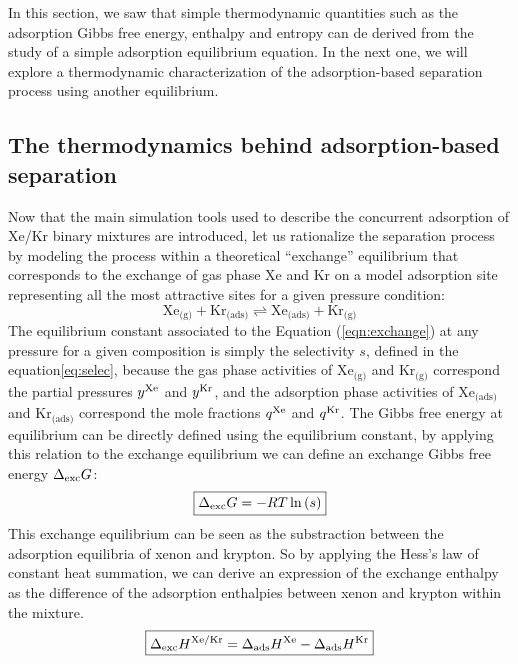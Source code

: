 \documentclass[main.tex]{subfiles}
\begin{document}
In this section, we saw that simple thermodynamic quantities such as the adsorption Gibbs free energy, enthalpy and entropy can de derived from the study of a simple adsorption equilibrium equation. In the next one, we will explore a thermodynamic characterization of the adsorption-based separation process using another equilibrium. 

\subsection{The thermodynamics behind adsorption-based separation}

Now that the main simulation tools used to describe the concurrent adsorption of Xe/Kr binary mixtures are introduced, let us rationalize the separation process by modeling the process within a theoretical ``exchange'' equilibrium that corresponds to the exchange of gas phase Xe and Kr on a model adsorption site representing all the most attractive sites for a given pressure condition:
\begin{equation} \label{eqn:exchange}
    \text{Xe}_{\text{(g)}} + \text{Kr}_{\text{(ads)}}
    \rightleftharpoons \text{Xe}_{\text{(ads)}} + \text{Kr}_{\text{(g)}}
\end{equation}
The equilibrium constant associated to the Equation (\ref{eqn:exchange}) at any pressure for a given composition is simply the selectivity $s$, defined in the equation\ref{eq:selec}, because the gas phase activities of $\text{Xe}_{\text{(g)}}$ and $\text{Kr}_{\text{(g)}}$ correspond the partial pressures $y^{\text{Xe}}$ and $y^{\text{Kr}}$, and the adsorption phase activities of $\text{Xe}_{\text{(ads)}}$ and $\text{Kr}_{\text{(ads)}}$ correspond the mole fractions $q^{\text{Xe}}$ and $q^{\text{Kr}}$. The Gibbs free energy at equilibrium can be directly defined using the equilibrium constant, by applying this relation to the exchange equilibrium we can define an exchange Gibbs free energy $\Delta_{\text{exc}}G$:
\begin{equation}
  \boxed{
  \Delta_{\text{exc}}G = -RT \ln\left(s\right)
  }
\end{equation}
This exchange equilibrium can be seen as the substraction between the adsorption equilibria of xenon and krypton. So by applying the Hess's law of constant heat summation, we can derive an expression of the exchange enthalpy as the difference of the adsorption enthalpies between xenon and krypton within the mixture. 
\begin{equation}
  \boxed{
  \Delta_{\text{exc}}H^{\text{Xe/Kr}} = \Delta_{\text{ads}}H^{\text{Xe}} - \Delta_{\text{ads}}H^{\text{Kr}}
  }
\end{equation}
\end{document}
